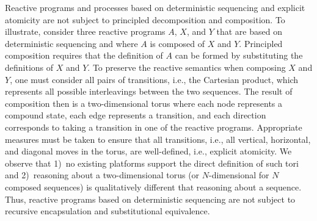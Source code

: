 Reactive programs and processes based on deterministic sequencing and explicit atomicity are not subject to principled decomposition and composition.
To illustrate, consider three reactive programs $A$, $X$, and $Y$ that are based on deterministic sequencing and where $A$ is composed of $X$ and $Y$.
Principled composition requires that the definition of $A$ can be formed by substituting the definitions of $X$ and $Y$.
To preserve the reactive semantics when composing $X$ and $Y$, one must consider all pairs of transitions, i.e., the Cartesian product, which represents all possible interleavings between the two sequences.
The result of composition then is a two-dimensional torus where each node represents a compound state, each edge represents a transition, and each direction corresponds to taking a transition in one of the reactive programs.
Appropriate measures must be taken to ensure that all transitions, i.e., all vertical, horizontal, and diagonal moves in the torus, are well-defined, i.e., explicit atomicity.
We observe that 1)~no existing platforms support the direct definition of such tori and 2)~reasoning about a two-dimensional torus (or $N$-dimensional for $N$ composed sequences) is qualitatively different that reasoning about a sequence.
Thus, reactive programs based on deterministic sequencing are not subject to recursive encapsulation and substitutional equivalence.


